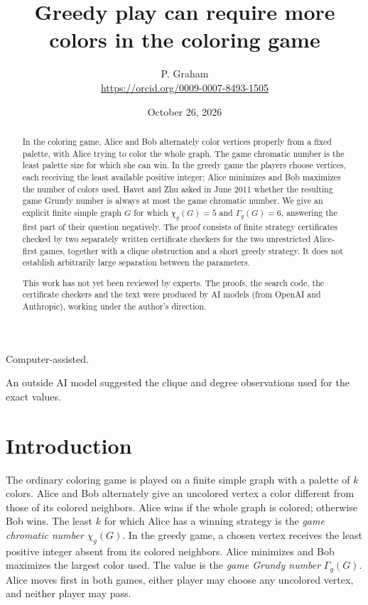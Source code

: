\documentclass[11pt]{article}
\title{Greedy play can require more colors in the coloring game}
\author{P. Graham\\ \small\url{https://orcid.org/0009-0007-8493-1505}}
\date{October 26, 2026}
\newcommand{\chig}{\chi_g}
\newcommand{\Gammag}{\Gamma_g}
\begin{document}
\maketitle
\begin{abstract}
In the coloring game, Alice and Bob alternately color vertices properly
from a fixed palette, with Alice trying to color the whole graph.
The game chromatic number is the least palette size for which she can win.
In the greedy game the players choose vertices, each receiving the least
available positive integer; Alice minimizes and Bob maximizes the number
of colors used. Havet and Zhu asked in June 2011 whether the resulting
game Grundy number is always at most the game chromatic number.
We give an explicit finite simple graph $G$ for which
$\chig(G)=5$ and $\Gammag(G)=6$, answering the first part of their question
negatively. The proof consists of finite strategy certificates checked by two separately written
certificate checkers for the two unrestricted Alice-first games, together with
a clique obstruction and a short greedy strategy. It does not
establish arbitrarily large separation between the parameters.

This work has not yet been reviewed by experts.
The proofs, the search code, the certificate checkers and the text were
produced by AI models (from OpenAI and Anthropic), working under the
author's direction.
\end{abstract}

\noindent Computer-assisted. 

\smallskip
\noindent 
An outside AI model suggested the clique and degree observations used for the exact values.

\section{Introduction}
The ordinary coloring game is played on a finite simple graph with a
palette of $k$ colors. Alice and Bob alternately give an uncolored vertex
a color different from those of its colored neighbors. Alice wins if the
whole graph is colored; otherwise Bob wins. The least $k$ for which Alice
has a winning strategy is the \emph{game chromatic number} $\chig(G)$.
In the greedy game, a chosen vertex receives the least positive integer
absent from its colored neighbors. Alice minimizes and Bob maximizes the
largest color used. The value is the \emph{game Grundy number} $\Gammag(G)$.
Alice moves first in both games, either player may choose any uncolored
vertex, and neither player may pass.
\end{document}
